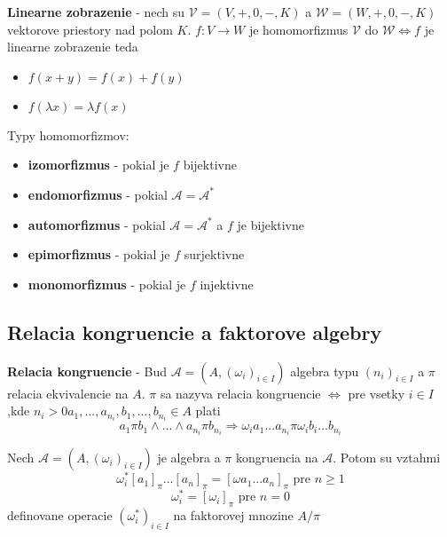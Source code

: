 \documentclass[12pt]{article}
\begin{document}
\textbf{Linearne zobrazenie} - nech su $\mathcal{V} = (V,+,0,-,K)$ a $\mathcal{W} = (W,+,0,-,K)$ vektorove priestory nad polom $K$.
$f: V \to W$ je homomorfizmus $\mathcal{V}$ do $\mathcal{W} \Leftrightarrow f$ je linearne zobrazenie teda
\begin{itemize}
	\item $f(x + y) = f(x) + f(y)$
	\item $f(\lambda x) = \lambda f(x)$
\end{itemize}

Typy homomorfizmov:
\begin{itemize}
	\item \textbf{izomorfizmus} - pokial je $f$ bijektivne
	\item \textbf{endomorfizmus} - pokial $\mathcal{A} = \mathcal{A}^{*}$
	\item \textbf{automorfizmus} - pokial $\mathcal{A} = \mathcal{A}^{*}$ a $f$ je bijektivne
	\item \textbf{epimorfizmus} - pokial je $f$ surjektivne
	\item \textbf{monomorfizmus} - pokial je $f$ injektivne
\end{itemize}

\subsection{Relacia kongruencie a faktorove algebry}
\textbf{Relacia kongruencie} - Bud $\mathcal{A} = (A, (\omega_{i})_{i \in I})$ algebra typu $(n_{i})_{i \in I}$
a $\pi$ relacia ekvivalencie na $A$. $\pi$ sa nazyva relacia kongruencie $\Leftrightarrow$ pre vsetky $i \in I$
,kde $n_{i} > 0 a_{1},...,a_{n_{i}},b_{1},...,b_{n_{i}} \in A$ plati
\begin{equation*}
	a_{1}\pi b_{1} \land ... \land a_{n_{i}}\pi b_{n_{i}} \Rightarrow \omega_{i}a_{1}...a_{n_{i}}\pi \omega_{i}b_{i}...b_{n_{i}}
\end{equation*}

Nech $\mathcal{A} = (A,(\omega_{i})_{i \in I})$ je algebra a $\pi$ kongruencia na $\mathcal{A}$. Potom su vztahmi
\begin{equation*}
	\omega^{*}_{i}[a_{1}]_{\pi}...[a_{n}]_{\pi} = [\omega a_{1}...a_{n}]_{\pi} \text{ pre }n \ge 1
\end{equation*}
\begin{equation*}
	\omega^{*}_{i} = [\omega_{i}]_{\pi} \text{ pre }n = 0
\end{equation*}
definovane operacie $(\omega^{*}_{i})_{i \in I}$ na faktorovej mnozine $A/\pi$
\end{document}

